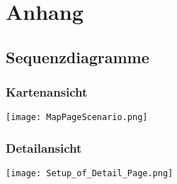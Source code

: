 \section{Anhang}
\subsection{Sequenzdiagramme}
\subsubsection*{Kartenansicht}
\texttt{[image: MapPageScenario.png]}

\subsubsection*{Detailansicht}
\texttt{[image: Setup\_of\_Detail\_Page.png]}